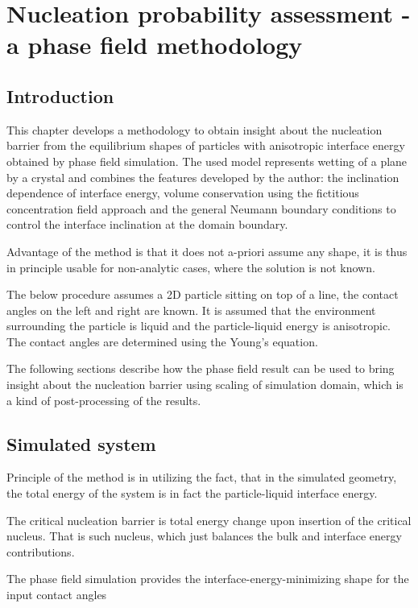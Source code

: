 \chapter{Nucleation probability assessment - a phase field methodology}
\section{Introduction}
This chapter develops a methodology to obtain insight about the nucleation barrier from the equilibrium shapes of particles with anisotropic interface energy obtained by phase field simulation. The used model represents wetting of a plane by a crystal and combines the features developed by the author: the inclination dependence of interface energy, volume conservation using the fictitious concentration field approach and the general Neumann boundary conditions to control the interface inclination at the domain boundary. 

Advantage of the method is that it does not a-priori assume any shape, it is thus in principle usable for non-analytic cases, where the solution is not known.

The below procedure assumes a 2D particle sitting on top of a line, the contact angles on the left and right are known. It is assumed that the environment surrounding the particle is liquid and the particle-liquid energy is anisotropic. The contact angles are determined using the Young's equation. 

The following sections describe how the phase field result can be used to bring insight about the nucleation barrier using scaling of simulation domain, which is a kind of post-processing of the results. 

\section{Simulated system}
Principle of the method is in utilizing the fact, that in the simulated geometry, the total energy of the system is in fact the particle-liquid interface energy. 

The critical nucleation barrier is total energy change upon insertion of the critical nucleus. That is such nucleus, which just balances the bulk and interface energy contributions. 

The phase field simulation provides the interface-energy-minimizing shape for the input contact angles

